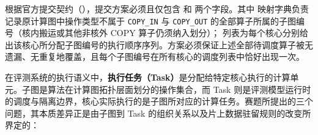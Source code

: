 \documentclass[anonymous,withtoc]{gmcm2026}
\begin{document}
根据官方提交契约（\texttt{}），提交方案必须且仅包含 \texttt{} 和 \texttt{} 两个字段。其中 \texttt{} 映射字典负责记录原计算图中操作类型不属于 \texttt{COPY\_IN} 与 \texttt{COPY\_OUT} 的全部算子所属的子图编号（核内搬运或其他非核外 COPY 算子仍须纳入划分）；\texttt{} 列表为每个核心分别给出该核心所分配子图编号的执行顺序序列。方案必须保证上述全部待调度算子被无遗漏、无重复地覆盖，且每个子图编号在所有核心的调度列表中恰好出现一次。

在评测系统的执行语义中，\textbf{执行任务（Task）}是分配给特定核心执行的计算单元。子图是算法在计算图拓扑层面划分的操作集合，而 Task 则是评测模型运行时的调度与隔离边界，核心实际执行的是子图所对应的计算任务。赛题所提出的三个问题，其本质差异正是由子图到 Task 的组织关系以及片上数据驻留规则的改变所界定的：
\end{document}
